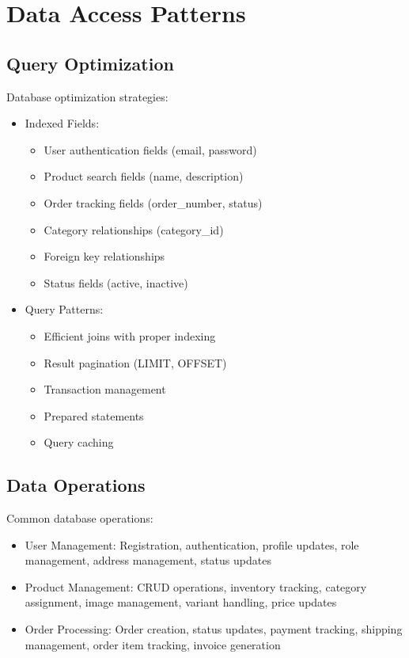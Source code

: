 \section{Data Access Patterns}
\subsection{Query Optimization}
Database optimization strategies:
\begin{itemize}
    \item Indexed Fields:
    \begin{itemize}
        \item User authentication fields (email, password)
        \item Product search fields (name, description)
        \item Order tracking fields (order\_number, status)
        \item Category relationships (category\_id)
        \item Foreign key relationships
        \item Status fields (active, inactive)
    \end{itemize}
    \item Query Patterns:
    \begin{itemize}
        \item Efficient joins with proper indexing
        \item Result pagination (LIMIT, OFFSET)
        \item Transaction management
        \item Prepared statements
        \item Query caching
    \end{itemize}
\end{itemize}

\subsection{Data Operations}
Common database operations:
\begin{itemize}
    \item User Management: Registration, authentication, profile updates, role management, address management, status updates
    \item Product Management: CRUD operations, inventory tracking, category assignment, image management, variant handling, price updates
    \item Order Processing: Order creation, status updates, payment tracking, shipping management, order item tracking, invoice generation
\end{itemize}

